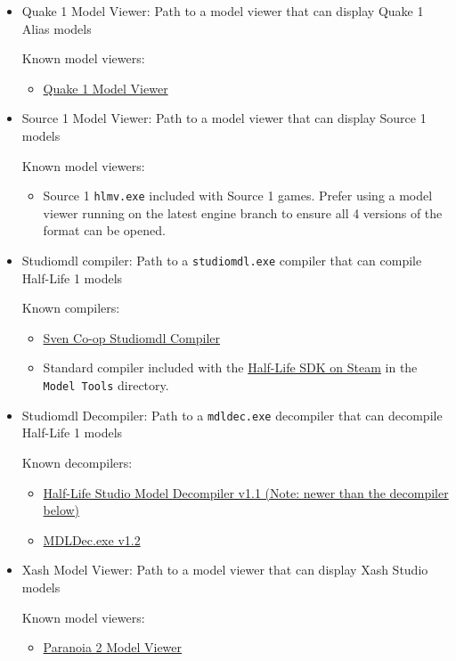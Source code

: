 \documentclass[10pt, a4paper, titlepage, oneside]{article}
\newcommand{\code}[1]{\mbox{\texttt{#1}}}
\begin{document}
\begin{itemize}
\item Quake 1 Model Viewer: Path to a model viewer that can display Quake 1 Alias models

	Known model viewers:
	\begin{itemize}
	\item \href{https://www.moddb.com/games/quake/downloads/quake-1-model-viewer-v050-alpha}{Quake 1 Model Viewer}
	\end{itemize}
\item Source 1 Model Viewer: Path to a model viewer that can display Source 1 models

	Known model viewers:
	\begin{itemize}
	\item Source 1 \code{hlmv.exe} included with Source 1 games. Prefer using a model viewer running on the latest engine branch to ensure all 4 versions of the format can be opened.
	\end{itemize}
\item Studiomdl compiler: Path to a \code{studiomdl.exe} compiler that can compile Half-Life 1 models

	Known compilers:
	\begin{itemize}
	\item \href{http://www.the303.org/backups/sven_studiomdl_2019.rar}{Sven Co-op Studiomdl Compiler}
	\item Standard compiler included with the \href{https://steamdb.info/app/254430/}{Half-Life SDK on Steam} in the \code{Model Tools} directory.
	\end{itemize}
\item Studiomdl Decompiler: Path to a \code{mdldec.exe} decompiler that can decompile Half-Life 1 models

	Known decompilers:
	\begin{itemize}
	\item \href{https://www.moddb.com/downloads/half-life-studio-model-decompilerwin32-linux}{Half-Life Studio Model Decompiler v1.1 (Note: newer than the decompiler below)}
	\item \href{https://www.wunderboy.org/downloads/mdldec12-zip/?tmstv=1673442739}{MDLDec.exe v1.2}
	\end{itemize}
\item Xash Model Viewer: Path to a model viewer that can display Xash Studio models

	Known model viewers:
	\begin{itemize}
	\item \href{https://gamebanana.com/tools/6828}{Paranoia 2 Model Viewer}
	\end{itemize}
\end{itemize}
\end{document}
